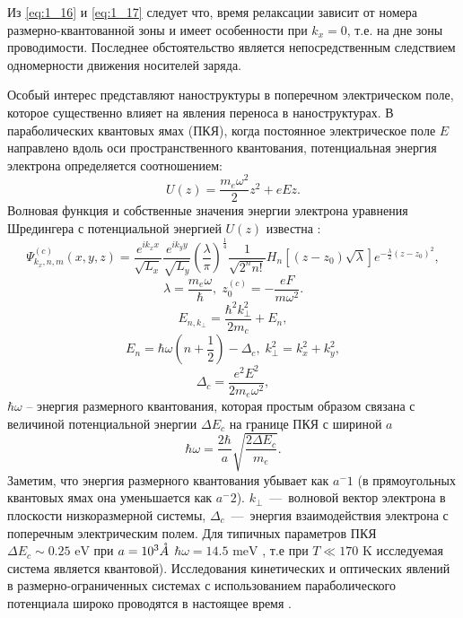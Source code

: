 Из \eqref{eq:1_16} и \eqref{eq:1_17} следует что, время релаксации зависит от номера размерно-квантованной зоны и имеет особенности при $k_x=0$, т.е. на дне зоны проводимости. Последнее обстоятельство является непосредственным следствием одномерности движения носителей заряда. 

Особый интерес представляют наноструктуры в поперечном электрическом поле, которое существенно влияет на явления переноса в наноструктурах. В параболических квантовых ямах (ПКЯ), когда постоянное электрическое поле $E$ направлено вдоль оси пространственного квантования, потенциальная энергия электрона определяется соотношением:
\[
U(z)=\frac{m_e \omega^2 }{2} z^2 +eEz.
\]
Волновая функция и собственные значения энергии электрона уравнения Шредингера с потенциальной энергией $U(z)$ известна \cite{Sinyavskii1998}:
\begin{equation}
\Psi^{(c)}_{k_x,n,m}(x,y,z)=\frac{e^{ik_x x}}{\sqrt{L_x}}\frac{e^{ik_y y}}{\sqrt{L_y}}{\left(\frac{\lambda }{\pi}\right)}^{\frac{1}{4}}\frac{1}{\sqrt{2^nn!}}H_n\left[(z-z_0)\sqrt{\lambda }\right]e^{-\frac{\lambda }{2}(z-z_0)^2},
\end{equation}
\[
\lambda =\frac{m_e\omega }{\hbar},\;
z^{(c)}_0 = -\frac{eF}{m{\omega }^2}.
\]
\begin{equation} \label{eq:41_10}
E_{n,k_{\bot } } =\frac{\hbar^2 k_{\bot }^2 }{2m_c} +E_n,
\end{equation}
\[
E_n =\hbar \omega \left(n+\frac{1}{2} \right)-\Delta_c, \;
k_{\bot }^2 =k_x^2 +k_y^2,
\]
\begin{equation} \label{eq:41_15}
\Delta_c =\frac{e^2 E^2 }{2m_e \omega^2},
\end{equation}
$\hbar \omega $ -- энергия размерного квантования, которая простым образом связана с величиной потенциальной энергии $\Delta E_c$ на границе ПКЯ с шириной $a$
\[
\hbar \omega =\frac{2\hbar }{a} \sqrt{\frac{2\Delta E_c }{m_e} }.
\]
Заметим, что энергия размерного квантования убывает как $a^-1$  (в прямоугольных квантовых ямах она уменьшается как  $a^-2$).  
$k_{\bot } $~---~волновой вектор электрона в плоскости низкоразмерной системы, $\Delta_c$~---~энергия взаимодействия электрона с поперечным электрическим полем.
Для типичных параметров ПКЯ $\Delta E_c \sim 0.25\text{ eV} $ при $a=10^3 \AA$ $\hbar\omega = 14.5 \text{ meV}$ , т.е при $T \ll 170 \text{ K}$  исследуемая система является квантовой). Исследования кинетических и оптических явлений в размерно-ограниченных системах с использованием параболического потенциала широко проводятся в настоящее время \cite{Moldoveanu2010,Gusev2010}.

